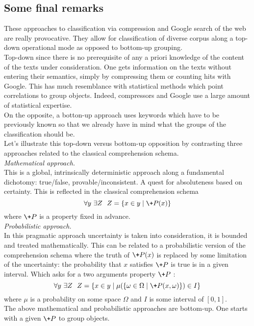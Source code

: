 \subsection{Some final remarks}
These approaches to classification via compression
and Google search of the web are really provocative.
They allow for classification of diverse corpus along a
top-down operational mode as opposed to bottom-up grouping.
\\
Top-down since there is no prerequisite of any a priori knowledge
of the content of the texts under consideration.
One gets information on the texts without entering their
semantics, simply by compressing them or counting hits with Google.
This has much resemblance with statistical methods which point
correlations to group objects. Indeed, compressors and Google
use a large amount of statistical expertise.
\\
On the opposite, a botton-up approach uses keywords which have to
be previously known so that we already have in mind what the
groups of the classification should be.
\medskip\\
Let's illustrate this top-down versus bottom-up opposition
by contrasting three approaches related to the classical
comprehension schema.
\medskip\\
{\em Mathematical approach.}\\
This is a global, intrinsically deterministic approach
along a fundamental dichotomy: true/false,
provable/inconsistent.
A quest for absoluteness based on certainty.
This is reflected in the classical comprehension schema
$$
\forall y\ \exists Z\ \ Z=\{x\in y \mid \+P(x)\}
$$
where $\+P$ is a property fixed in advance.
\medskip\\
{\em Probabilistic approach.}\\
In this pragmatic approach uncertainty is taken into consideration,
it is bounded and treated mathematically.
This can be related to a probabilistic version
of the comprehension schema where the truth of $\+P(x)$ is
replaced by some limitation of the uncertainty: the probability
that $x$ satisfies $\+P$ is true is in a given interval.
Which asks for a two arguments property $\+P$ :
$$
\forall y\ \exists Z\ \ Z=\{x\in y \mid
\mu(\{\omega\in\Omega\mid\+P(x,\omega)\})\in I\}
$$
where $\mu$ is a probability on some space $\Omega$
and $I$ is some interval of $[0,1]$.
\medskip\\
The above mathematical and probabilistic approaches are
bottom-up. One starts with a given $\+P$ to group objects.
\medskip\\
